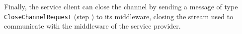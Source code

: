 Finally, the service client can close the channel by sending a message
of type \texttt{CloseChannelRequest} (step ) to its
middleware, closing the stream used to communicate with the
middleware of the service provider.


